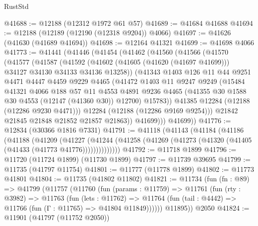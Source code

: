 \begin{lexlean}{RustStd}
\begin{coremodule}
@41688 := @12188 (@12312 @1972 @61 @57)
@41689 := @41684 @41688
@41694 := @12188 (@12189 (@12190 (@12318 @9204)) @4066)
@41697 := @41626 (@41630 (@41689 @41694))
@41698 := @12164 @41321
@41699 := @41698 @4066
@41773 := @41441
    (@41446
      (@41454
        (@41462
          (@41560
            (@41566
              (@41570
                (@41577
                  (@41587
                    (@41592
                      (@41602 (@41605 (@41620 (@41697 @41699))) @34127 @34130 @34133 @34136 @13258))
                    (@41343
                      @1403
                      @126
                      @11
                      @44
                      @9251
                      @4471
                      @4447
                      @4459
                      @9229
                      @4465
                      (@41472
                        @1403
                        @11
                        @9247
                        @9249
                        (@15484
                          @41321
                          @4066
                          @188
                          @57
                          @11
                          @4553
                          @4891
                          @9236
                          @4465
                          (@41355 @30 @1588 @30 @4553 (@12147 (@41360 @30)) @12700)
                          @15783))
                      @41385
                      @12284
                      (@12188 (@12286 @9230 @4471)))
                    @12284
                    (@12188 (@12286 @9169 @9254)))
                  @21842
                  @21845
                  @21848
                  @21852
                  @21857
                  @21863))
              @41699)))
        @41699))
@41776 := @12834 (@30366 @1816 @7331)
@41791 := @41118
    (@41143
      (@41184
        (@41186
          (@41188
            (@41209
              (@41227
                (@41244 (@41258 (@41269 (@41273 (@41320 (@41405 (@41433 (@41773 @41776))))))))))))))
@41792 := @11718 @1899
@41796 := @11720 (@11724 @1899) (@11730 @1899)
@41797 := @11739 @39695
@41799 := @11735 (@41797 @11754)
@41801 := @11777 (@11778 @1899)
@41802 := @11773 @41801
@41804 := @11735 (@41802 @11802)
@41821 := @11734
    (fun (fn : @89) =>
    @41799
      (@11757
        (@11760
          (fun (params : @11759) =>
          @11761
            (fun (rty : @3982) =>
            @11763
              (fun (lets : @11762) =>
              @11764 (fun (tail : @4442) => @11766 (fun (Γ : @11765) => @41804 @11849))))))
        @11895))
    @2050
@41824 := @11901 (@41797 (@11752 @2050))

\end{coremodule}
\end{lexlean}
